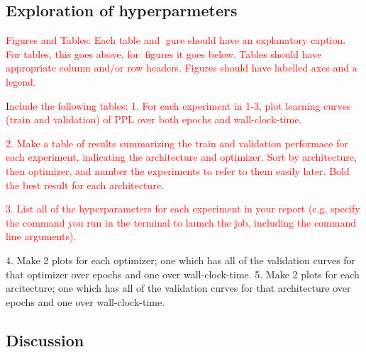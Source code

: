 \subsection{Exploration of hyperparmeters}

\textcolor{red}{Figures and Tables:
Each table and gure should have an explanatory caption. 
For tables, this goes above, for figures it goes below. 
Tables should have appropriate column and/or row headers.
Figures should have labelled axes and a legend. }

I\textcolor{red}{nclude the following tables:
1. For each experiment in 1-3, plot learning curves (train and validation) of PPL over both
epochs and wall-clock-time.}

\textcolor{red}{2. Make a table of results summarizing the train and validation performace for each experiment,
	indicating the architecture and optimizer. Sort by architecture, then optimizer, and number
	the experiments to refer to them easily later. Bold the best result for each architecture.}

\textcolor{red}{3. List all of the hyperparameters for each experiment in your report (e.g. specify the command
you run in the terminal to launch the job, including the command line arguments).}

4. Make 2 plots for each optimizer; one which has all of the validation curves for that optimizer
over epochs and one over wall-clock-time.
5. Make 2 plots for each arcitecture; one which has all of the validation curves for that architecture
over epochs and one over wall-clock-time.
\subsection{Discussion}